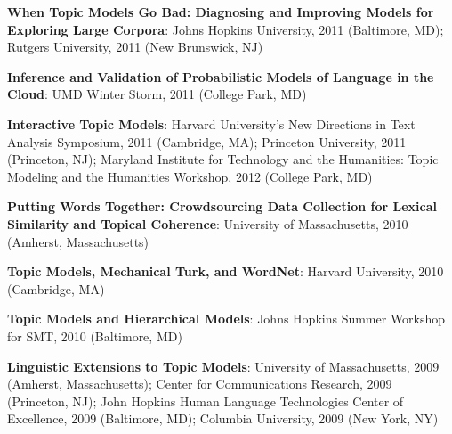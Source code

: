 {{\begin{enumerate*}
	\item {\bf When Topic Models Go Bad: Diagnosing and Improving Models for Exploring Large Corpora}: Johns Hopkins University, 2011 (Baltimore, MD); Rutgers University, 2011 (New Brunswick, NJ)
	\item {\bf Inference and Validation of Probabilistic Models of Language in the Cloud}: UMD Winter Storm, 2011 (College Park, MD)
	\item {\bf Interactive Topic Models}: Harvard University's New
          Directions in Text Analysis Symposium, 2011 (Cambridge, MA);
          Princeton University, 2011 (Princeton, NJ); Maryland
          Institute for Technology and the Humanities: Topic Modeling
          and the Humanities Workshop, 2012 (College Park, MD)
	\item {\bf Putting Words Together: Crowdsourcing Data Collection for Lexical Similarity and Topical Coherence}: University of Massachusetts, 2010 (Amherst, Massachusetts)
	\item {\bf Topic Models, Mechanical Turk, and WordNet}: Harvard University, 2010 (Cambridge, MA)
	\item {\bf Topic Models and Hierarchical Models}: Johns Hopkins Summer Workshop for SMT, 2010 (Baltimore, MD)
	\item {\bf Linguistic Extensions to Topic Models}: University of
          Massachusetts, 2009 (Amherst, Massachusetts); Center for
          Communications Research, 2009 (Princeton, NJ); John Hopkins Human
          Language Technologies Center of Excellence, 2009 (Baltimore, MD); Columbia University, 2009 (New York, NY)
\end{enumerate*}


}
}



\ifumd
\else
{}
\fi

\ifgerman
\else
\ifumd
\else
\fi




\fi

\ifumd
\talks{}
\fi


\ifgerman

\else

\fi


\ifumd
{}

